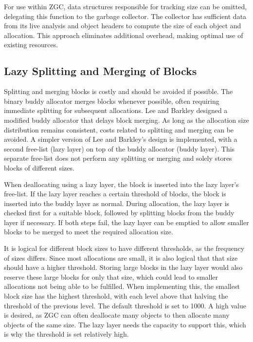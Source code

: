 For use within ZGC, data structures responsible for tracking size can be omitted, delegating this function to the garbage collector. The collector has sufficient data from its live analysis and object headers to compute the size of each object and allocation. This approach eliminates additional overhead, making optimal use of existing resources.

\subsection{Lazy Splitting and Merging of Blocks} \label{sec:lazyexpl}
Splitting and merging blocks is costly and should be avoided if possible. The binary buddy allocator merges blocks whenever possible, often requiring immediate splitting for subsequent allocations. Lee and Barkley \cite{lazylayer} designed a modified buddy allocator that delays block merging. As long as the allocation size distribution remains consistent, costs related to splitting and merging can be avoided. A simpler version of Lee and Barkley's design is implemented, with a second free-list (lazy layer) on top of the buddy allocator (buddy layer). This separate free-list does not perform any splitting or merging and solely stores blocks of different sizes.

When deallocating using a lazy layer, the block is inserted into the lazy layer's free-list. If the lazy layer reaches a certain threshold of blocks, the block is inserted into the buddy layer as normal. During allocation, the lazy layer is checked first for a suitable block, followed by splitting blocks from the buddy layer if necessary. If both steps fail, the lazy layer can be emptied to allow smaller blocks to be merged to meet the required allocation size.

It is logical for different block sizes to have different thresholds, as the frequency of sizes differs. Since most allocations are small, it is also logical that that size should have a higher threshold. Storing large blocks in the lazy layer would also reserve these large blocks for only that size, which could lead to smaller allocations not being able to be fulfilled. When implementing this, the smallest block size has the highest threshold, with each level above that halving the threshold of the previous level. The default threshold is set to 1000. A high value is desired, as ZGC can often deallocate many objects to then allocate many objects of the same size. The lazy layer needs the capacity to support this, which is why the threshold is set relatively high.


